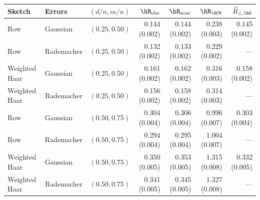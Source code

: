 \begin{tabular}{@{}llrrrrr@{}}
\toprule
Sketch & Errors & $(d/n,m/n)$ & $\hR_{\mathrm{obs}}$ & $\hR_{\mathrm{sens}}$ & $\hR_{\GCV}$ & $\widehat R_{\perp,\bS}$ \\
\midrule
Row & Gaussian & $(0.25,0.50)$ & 0.144 (0.002) & 0.144 (0.002) & 0.238 (0.003) & 0.145 (0.002) \\
Row & Rademacher & $(0.25,0.50)$ & 0.132 (0.002) & 0.133 (0.002) & 0.229 (0.002) & --- \\
Weighted Haar & Gaussian & $(0.25,0.50)$ & 0.161 (0.002) & 0.162 (0.002) & 0.316 (0.003) & 0.158 (0.002) \\
Weighted Haar & Rademacher & $(0.25,0.50)$ & 0.156 (0.002) & 0.158 (0.002) & 0.314 (0.003) & --- \\
\midrule
Row & Gaussian & $(0.50,0.75)$ & 0.304 (0.004) & 0.306 (0.004) & 0.996 (0.007) & 0.303 (0.004) \\
Row & Rademacher & $(0.50,0.75)$ & 0.294 (0.004) & 0.295 (0.004) & 1.004 (0.007) & --- \\
Weighted Haar & Gaussian & $(0.50,0.75)$ & 0.350 (0.005) & 0.353 (0.005) & 1.315 (0.008) & 0.332 (0.005) \\
Weighted Haar & Rademacher & $(0.50,0.75)$ & 0.341 (0.005) & 0.345 (0.005) & 1.327 (0.008) & --- \\
\bottomrule
\end{tabular}
